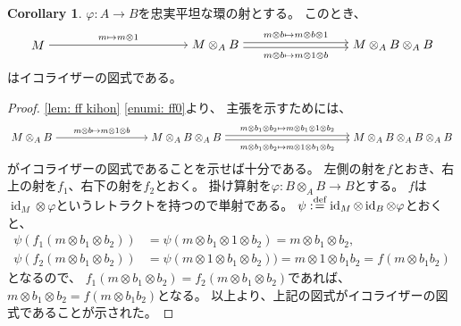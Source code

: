 \documentclass[uplatex]{jsarticle}
\theoremstyle{definition}
\newtheorem{cor}[cor]{Corollary}
\DeclareMathOperator{\id}{\mathrm{id}}
\newcommand{\dfn}{:\overset{\mbox{{\scriptsize def}}}{=}}
\begin{document}
\begin{cor}\label{cor: ff exact}
  \(\varphi: A\to B\)を忠実平坦な環の射とする。
  このとき、
  \[
  \begin{tikzpicture}[auto]
    \node (a) at (0, 0) {\(M\)};
    \node (b) at (5, 0) {\(M\otimes_A B\)};
    \node (c) at (10, 0) {\(M\otimes_A B\otimes_A B\)};
    \draw[->] (a) to node {\(\scriptstyle m\mapsto m\otimes 1\)} (b);
    \draw[->, transform canvas={yshift=2pt}]
    (b) to node {\(\scriptstyle m\otimes b\mapsto m\otimes b\otimes 1\)} (c);
    \draw[->, transform canvas={yshift=-2pt}]
    (b) to node[swap] {\(\scriptstyle m\otimes b\mapsto m\otimes 1\otimes b\)} (c);
  \end{tikzpicture}
  \]
  はイコライザーの図式である。
\end{cor}

\begin{proof}
  \autoref{lem: ff kihon} \ref{enumi: ff0}より、
  主張を示すためには、
  \[
  \begin{tikzpicture}[auto]
    \node (a) at (0, 0) {\(M\otimes_AB\)};
    \node (b) at (5, 0) {\(M\otimes_AB\otimes_AB\)};
    \node (c) at (12, 0) {\(M\otimes_AB\otimes_AB\otimes_AB\)};
    \draw[->] (a) to node {\(\scriptstyle m\otimes b\mapsto m\otimes 1\otimes b\)} (b);
    \draw[->, transform canvas={yshift=2pt}]
    (b) to node {\(\scriptstyle m\otimes b_1 \otimes b_2 \mapsto m\otimes b_1\otimes 1 \otimes b_2\)} (c);
    \draw[->, transform canvas={yshift=-2pt}]
    (b) to node[swap] {\(\scriptstyle m\otimes b_1 \otimes b_2 \mapsto m \otimes 1 \otimes b_1\otimes b_2\)} (c);
  \end{tikzpicture}
  \]
  がイコライザーの図式であることを示せば十分である。
  左側の射を\(f\)とおき、右上の射を\(f_1\)、右下の射を\(f_2\)とおく。
  掛け算射を\(\varphi :B \otimes_A B\to B\)とする。
  \(f\)は\(\id_M \otimes \varphi\)というレトラクトを持つので単射である。
  \(\psi \dfn \id_M \otimes \id_B \otimes \varphi\)とおくと、
  \begin{align*}
    \psi(f_1(m\otimes b_1 \otimes b_2))
    &= \psi(m\otimes b_1\otimes 1 \otimes b_2) = m\otimes b_1\otimes b_2, \\
    \psi(f_2(m\otimes b_1 \otimes b_2))
    &= \psi(m\otimes 1 \otimes b_1 \otimes b_2))
    = m\otimes 1 \otimes b_1b_2 = f(m\otimes b_1b_2)
  \end{align*}
  となるので、
  \(f_1(m\otimes b_1\otimes b_2) = f_2(m\otimes b_1\otimes b_2)\)であれば、
  \(m\otimes b_1\otimes b_2 = f(m\otimes b_1b_2)\)となる。
  以上より、上記の図式がイコライザーの図式であることが示された。
\end{proof}
\end{document}

